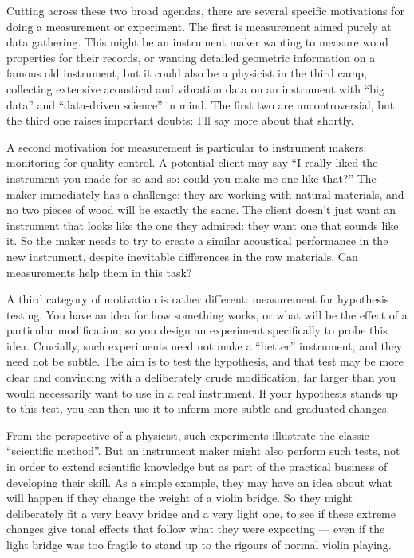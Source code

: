   Cutting across these two broad agendas, there are several specific 
  motivations for doing a measurement or experiment. The first is measurement 
  aimed purely at data gathering. This might be an instrument maker wanting to 
  measure wood properties for their records, or wanting detailed geometric 
  information on a famous old instrument, but it could also be a physicist in 
  the third camp, collecting extensive acoustical and vibration data on an 
  instrument with “big data” and “data-driven science” in mind. The first two 
  are uncontroversial, but the third one raises important doubts: I’ll say more 
  about that shortly. 

  A second motivation for measurement is particular to instrument makers: 
  monitoring for quality control. A potential client may say “I really liked 
  the instrument you made for so-and-so: could you make me one like that?” The 
  maker immediately has a challenge: they are working with natural materials, 
  and no two pieces of wood will be exactly the same. The client doesn’t just 
  want an instrument that looks like the one they admired: they want one that 
  sounds like it. So the maker needs to try to create a similar acoustical 
  performance in the new instrument, despite inevitable differences in the raw 
  materials. Can measurements help them in this task? 

  A third category of motivation is rather different: measurement for 
  hypothesis testing. You have an idea for how something works, or what will be 
  the effect of a particular modification, so you design an experiment 
  specifically to probe this idea. Crucially, such experiments need not make a 
  “better” instrument, and they need not be subtle. The aim is to test the 
  hypothesis, and that test may be more clear and convincing with a 
  deliberately crude modification, far larger than you would necessarily want 
  to use in a real instrument. If your hypothesis stands up to this test, you 
  can then use it to inform more subtle and graduated changes. 

  From the perspective of a physicist, such experiments illustrate the classic 
  “scientific method”. But an instrument maker might also perform such tests, 
  not in order to extend scientific knowledge but as part of the practical 
  business of developing their skill. As a simple example, they may have an 
  idea about what will happen if they change the weight of a violin bridge. So 
  they might deliberately fit a very heavy bridge and a very light one, to see 
  if these extreme changes give tonal effects that follow what they were 
  expecting — even if the light bridge was too fragile to stand up to the 
  rigours of normal violin playing. 


